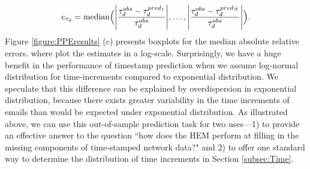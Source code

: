 \documentclass[ba]{imsart}
\numberwithin{equation}{section}
\theoremstyle{plain}
\DeclarePairedDelimiter\abs{\lvert}{\rvert}
\begin{document}
	\fi
	\begin{equation}
		e_{\tau_d} = \mbox{median}\Big(\abs*{\frac{\tau^{obs}_d - \tau^{pred_1}_{d}}{\tau^{obs}_d}},\ldots, \abs*{\frac{\tau^{obs}_d - \tau^{pred_N}_{d}}{\tau^{obs}_d}}\Big).
	\end{equation}
	Figure \ref{figure:PPEresults} (c) presents boxplots for the median absolute relative errors. where plot the estimates in a log-scale. Surprisingly, we have a huge benefit in the performance of timestamp prediction when we assume log-normal distribution for time-increments compared to exponential distribution. We speculate that this difference can be explained by overdispersion in exponential distribution, because there exists greater variability in the time increments of emails than would be expected under exponential distribution. As illustrated above, we can use this out-of-sample prediction task for two uses---1) to provide an effective answer to the question ``how does the HEM perform at filling in the missing components of time-stamped network data?" and 2) to offer one standard way to determine the distribution of time increments in Section \ref{subsec:Time}. 
	
\end{document}
